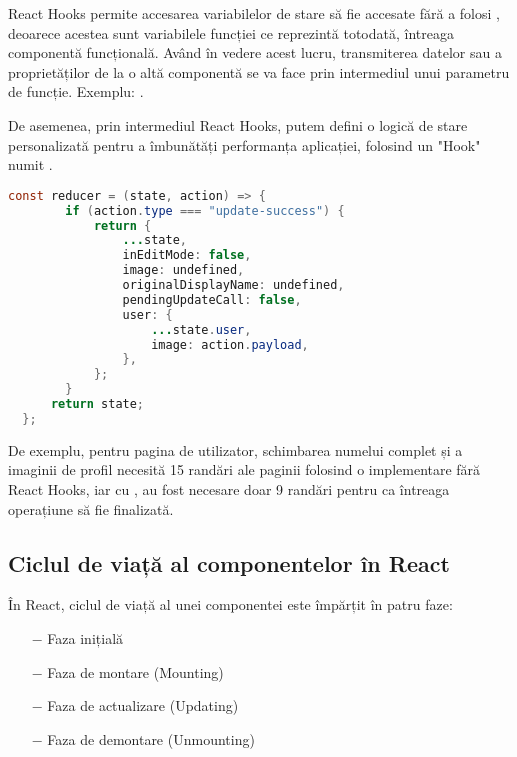 React Hooks permite accesarea variabilelor de stare să fie accesate fără a folosi , deoarece acestea sunt variabilele funcției ce reprezintă totodată, întreaga componentă funcțională. Având în vedere acest lucru, transmiterea datelor sau a proprietăților de la o altă componentă se va face prin intermediul unui parametru de funcție.\newline
Exemplu: .\newline

De asemenea, prin intermediul React Hooks, putem defini o logică de stare personalizată pentru a îmbunătăți performanța aplicației, folosind un "Hook" numit .\newline
\newline

\begin{lstlisting}[language=Java]
	const reducer = (state, action) => {
		if (action.type === "update-success") {
			return {
				...state,
				inEditMode: false,
				image: undefined,
				originalDisplayName: undefined,
				pendingUpdateCall: false,
				user: {
					...state.user,
					image: action.payload,
				},
			};
		}
	  return state;
  };
\end{lstlisting}
\bigskip

De exemplu, pentru pagina de utilizator, schimbarea numelui complet și a imaginii de profil necesită 15 randări ale paginii folosind o implementare fără React Hooks, iar cu , au fost necesare doar 9 randări pentru ca întreaga operațiune să fie finalizată.\newline

\subsection{Ciclul de viață al componentelor în React}

În React\cite{.reactbeginners}, ciclul de viață al unei componentei este împărțit în patru faze:

\begin{itemize}
	\addtolength{\itemindent}{1cm}
	\item[$-$]Faza inițială
	\item[$-$]Faza de montare (Mounting)
	\item[$-$]Faza de actualizare (Updating)
	\item[$-$]Faza de demontare (Unmounting)
	\newline
\end{itemize}

